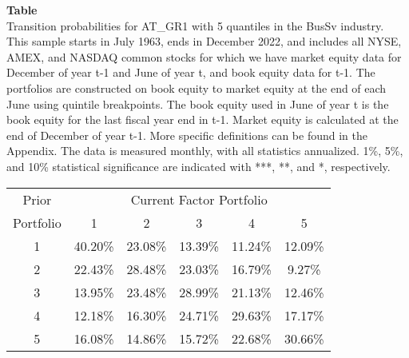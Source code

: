 \begin{table*}[ht!]
\raggedright
{}
\label{tab: transition_probs_AT_GR1_BusSv_with_5_quantiles}
\textbf{Table \thetable} \\
Transition probabilities for AT_GR1 with 5 quantiles in the BusSv industry. \\
\hspace*{1em}This sample starts in July 1963, ends in December 2022, and includes all NYSE, AMEX, and NASDAQ common stocks for which we have market equity data for December of year t-1 and June of year t, and book equity data for t-1. The portfolios are constructed on book equity to market equity at the end of each June using quintile breakpoints.  The book equity used in June of year t is the book equity for the last fiscal year end in t-1.  Market equity is calculated at the end of December of year t-1.  More specific definitions can be found in the Appendix.  The data is measured monthly, with all statistics annualized.  1\%, 5\%, and 10\% statistical significance are indicated with ***, **, and *, respectively. \\
\vspace{0.5em}
\centering
\begin{adjustbox}{max width=\textwidth}
\begin{tabular}{@{}cccccc@{}}
\toprule
Prior & \multicolumn{5}{c}{Current Factor Portfolio} \\
Portfolio & 1 & 2 & 3 & 4 & 5 \\
\midrule
1 & 40.20\% & 23.08\% & 13.39\% & 11.24\% & 12.09\% \\
2 & 22.43\% & 28.48\% & 23.03\% & 16.79\% & 9.27\% \\
3 & 13.95\% & 23.48\% & 28.99\% & 21.13\% & 12.46\% \\
4 & 12.18\% & 16.30\% & 24.71\% & 29.63\% & 17.17\% \\
5 & 16.08\% & 14.86\% & 15.72\% & 22.68\% & 30.66\% \\
\bottomrule
\end{tabular}
\end{adjustbox}
\end{table*}